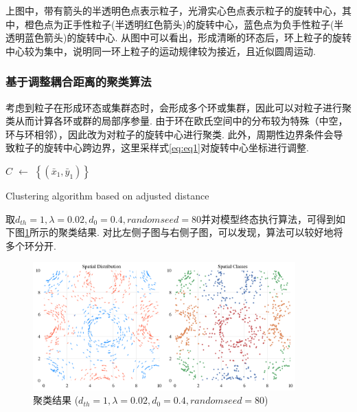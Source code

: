 \documentclass{article}
\begin{document}
上图中，带有箭头的半透明色点表示粒子，光滑实心色点表示粒子的旋转中心，其中，橙色点为正手性粒子(半透明红色箭头)的旋转中心，蓝色点为负手性粒子(半透明蓝色箭头)的旋转中心. 从图中可以看出，形成清晰的环态后，环上粒子的旋转中心较为集中，说明同一环上粒子的运动规律较为接近，且近似圆周运动.



\subsubsection{基于调整耦合距离的聚类算法}\label{clustering}

考虑到粒子在形成环态或集群态时，会形成多个环或集群，因此可以对粒子进行聚类从而计算各环或群的局部序参量. 由于环在欧氏空间中的分布较为特殊（中空，环与环相邻），因此改为对粒子的旋转中心进行聚类. 此外，周期性边界条件会导致粒子的旋转中心跨边界，这里采样式\ref{eq:eq1}对旋转中心坐标进行调整.

\begin{algorithm}

	\BlankLine
	\emph{$C$ $\leftarrow$ $\left\{(\bar{x}_1, \bar{y}_1)\right\}$}\;
	\caption{Clustering algorithm based on adjusted distance}\label{algo_disjdecomp}
\end{algorithm}\DecMargin{1em}

取$d_{th}=1, \lambda=0.02, d_0=0.4, random seed=80$并对模型终态执行算法，可得到如下图\ref{fig:fig233.1}所示的聚类结果. 对比左侧子图与右侧子图，可以发现，算法可以较好地将多个环分开.

\begin{figure}[H]
	\centering
	\includegraphics[width=0.9\textwidth]{./figs/ClusteringResult.png}
	\vspace{-0.4cm}
	\caption{聚类结果 ($d_{th}=1, \lambda=0.02, d_0=0.4, random seed=80$)}
	\label{fig:fig233.1}
\end{figure}
\end{document}
